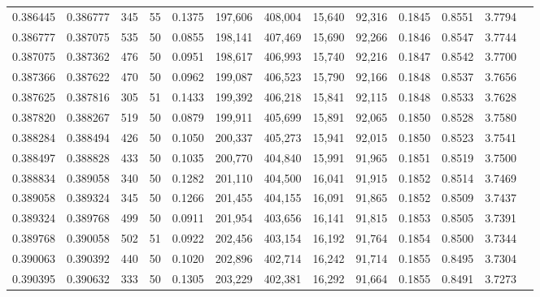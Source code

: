 \begin{tabular}{rrrrrrrrrrrrr}
0.386445 & 0.386777 &   345 &  55 &                                     0.1375 & 197,606 & 408,004 &  15,640 &  92,316 & 0.1845 & 0.8551 & 3.7794 \\
0.386777 & 0.387075 &   535 &  50 &                                     0.0855 & 198,141 & 407,469 &  15,690 &  92,266 & 0.1846 & 0.8547 & 3.7744 \\
0.387075 & 0.387362 &   476 &  50 &                                     0.0951 & 198,617 & 406,993 &  15,740 &  92,216 & 0.1847 & 0.8542 & 3.7700 \\
0.387366 & 0.387622 &   470 &  50 &                                     0.0962 & 199,087 & 406,523 &  15,790 &  92,166 & 0.1848 & 0.8537 & 3.7656 \\
0.387625 & 0.387816 &   305 &  51 &                                     0.1433 & 199,392 & 406,218 &  15,841 &  92,115 & 0.1848 & 0.8533 & 3.7628 \\
0.387820 & 0.388267 &   519 &  50 &                                     0.0879 & 199,911 & 405,699 &  15,891 &  92,065 & 0.1850 & 0.8528 & 3.7580 \\
0.388284 & 0.388494 &   426 &  50 &                                     0.1050 & 200,337 & 405,273 &  15,941 &  92,015 & 0.1850 & 0.8523 & 3.7541 \\
0.388497 & 0.388828 &   433 &  50 &                                     0.1035 & 200,770 & 404,840 &  15,991 &  91,965 & 0.1851 & 0.8519 & 3.7500 \\
0.388834 & 0.389058 &   340 &  50 &                                     0.1282 & 201,110 & 404,500 &  16,041 &  91,915 & 0.1852 & 0.8514 & 3.7469 \\
0.389058 & 0.389324 &   345 &  50 &                                     0.1266 & 201,455 & 404,155 &  16,091 &  91,865 & 0.1852 & 0.8509 & 3.7437 \\
0.389324 & 0.389768 &   499 &  50 &                                     0.0911 & 201,954 & 403,656 &  16,141 &  91,815 & 0.1853 & 0.8505 & 3.7391 \\
0.389768 & 0.390058 &   502 &  51 &                                     0.0922 & 202,456 & 403,154 &  16,192 &  91,764 & 0.1854 & 0.8500 & 3.7344 \\
0.390063 & 0.390392 &   440 &  50 &                                     0.1020 & 202,896 & 402,714 &  16,242 &  91,714 & 0.1855 & 0.8495 & 3.7304 \\
0.390395 & 0.390632 &   333 &  50 &                                     0.1305 & 203,229 & 402,381 &  16,292 &  91,664 & 0.1855 & 0.8491 & 3.7273 \\

\end{tabular}
